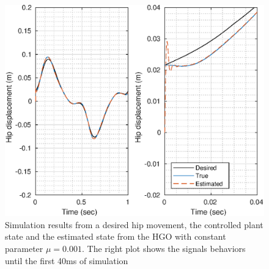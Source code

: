 \documentclass[letterpaper, 10 pt, conference]{ieeeconf}  %
\theoremstyle{plain}
\theoremstyle{definition}
\theoremstyle{remark}
\begin{document}
%
%
%
%
%
%
%
%
%
\begin{figure}[h!]
	\begin{center}
	\includegraphics[width = \columnwidth]{Figs/q_hip_mu_1e-03.eps}
	\caption{ Simulation results from a desired hip movement, the controlled plant state and the estimated state from the HGO with constant parameter $\mu=0.001$. The right plot shows the signals behaviors until the first 40ms of simulation}
	\label{fig:hip}
	\end{center}
\end{figure}
%
%
\end{document}
